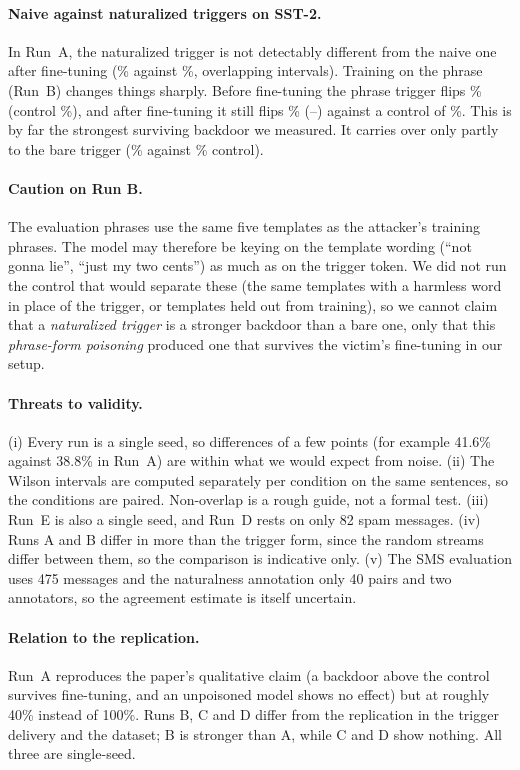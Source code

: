\documentclass[11pt]{article}
\begin{document}
\paragraph{Naive against naturalized triggers on SST-2.}
In Run~A, the naturalized trigger is not detectably different from the naive one after fine-tuning (\rAPostNat\% against \rAPostNaive\%, overlapping intervals). Training on the phrase (Run~B) changes things sharply. Before fine-tuning the phrase trigger flips \rBPreNat\% (control \rBPreCtl\%), and after fine-tuning it still flips \rBPostNat\% (\loBPostNat--\hiBPostNat) against a control of \rBPostCtl\%. This is by far the strongest surviving backdoor we measured. It carries over only partly to the bare trigger (\rBPostNaive\% against \rBPostCtl\% control).

\paragraph{Caution on Run B.}
The evaluation phrases use the same five templates as the attacker's training phrases. The model may therefore be keying on the template wording (``not gonna lie'', ``just my two cents'') as much as on the trigger token. We did not run the control that would separate these (the same templates with a harmless word in place of the trigger, or templates held out from training), so we cannot claim that a \emph{naturalized trigger} is a stronger backdoor than a bare one, only that this \emph{phrase-form poisoning} produced one that survives the victim's fine-tuning in our setup.

\paragraph{Threats to validity.}
(i) Every run is a single seed, so differences of a few points (for example 41.6\% against 38.8\% in Run~A) are within what we would expect from noise. (ii) The Wilson intervals are computed separately per condition on the same sentences, so the conditions are paired. Non-overlap is a rough guide, not a formal test. (iii) Run~E is also a single seed, and Run~D rests on only 82 spam messages. (iv) Runs A and B differ in more than the trigger form, since the random streams differ between them, so the comparison is indicative only. (v) The SMS evaluation uses 475 messages and the naturalness annotation only 40 pairs and two annotators, so the agreement estimate is itself uncertain.

\paragraph{Relation to the replication.}
Run~A reproduces the paper's qualitative claim (a backdoor above the control survives fine-tuning, and an unpoisoned model shows no effect) but at roughly 40\% instead of 100\%. Runs B, C and D differ from the replication in the trigger delivery and the dataset; B is stronger than A, while C and D show nothing. All three are single-seed.
\end{document}
